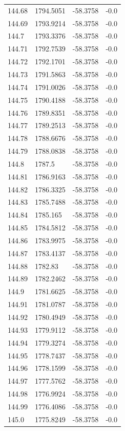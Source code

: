 \begin{table}[H]
\begin{tabular}{llll}
144.68 & 1794.5051 & -58.3758 & -0.0 \\
144.69 & 1793.9214 & -58.3758 & -0.0 \\
144.7 & 1793.3376 & -58.3758 & -0.0 \\
144.71 & 1792.7539 & -58.3758 & -0.0 \\
144.72 & 1792.1701 & -58.3758 & -0.0 \\
144.73 & 1791.5863 & -58.3758 & -0.0 \\
144.74 & 1791.0026 & -58.3758 & -0.0 \\
144.75 & 1790.4188 & -58.3758 & -0.0 \\
144.76 & 1789.8351 & -58.3758 & -0.0 \\
144.77 & 1789.2513 & -58.3758 & -0.0 \\
144.78 & 1788.6676 & -58.3758 & -0.0 \\
144.79 & 1788.0838 & -58.3758 & -0.0 \\
144.8 & 1787.5 & -58.3758 & -0.0 \\
144.81 & 1786.9163 & -58.3758 & -0.0 \\
144.82 & 1786.3325 & -58.3758 & -0.0 \\
144.83 & 1785.7488 & -58.3758 & -0.0 \\
144.84 & 1785.165 & -58.3758 & -0.0 \\
144.85 & 1784.5812 & -58.3758 & -0.0 \\
144.86 & 1783.9975 & -58.3758 & -0.0 \\
144.87 & 1783.4137 & -58.3758 & -0.0 \\
144.88 & 1782.83 & -58.3758 & -0.0 \\
144.89 & 1782.2462 & -58.3758 & -0.0 \\
144.9 & 1781.6625 & -58.3758 & -0.0 \\
144.91 & 1781.0787 & -58.3758 & -0.0 \\
144.92 & 1780.4949 & -58.3758 & -0.0 \\
144.93 & 1779.9112 & -58.3758 & -0.0 \\
144.94 & 1779.3274 & -58.3758 & -0.0 \\
144.95 & 1778.7437 & -58.3758 & -0.0 \\
144.96 & 1778.1599 & -58.3758 & -0.0 \\
144.97 & 1777.5762 & -58.3758 & -0.0 \\
144.98 & 1776.9924 & -58.3758 & -0.0 \\
144.99 & 1776.4086 & -58.3758 & -0.0 \\
145.0 & 1775.8249 & -58.3758 & -0.0 \\

\end{tabular}
\end{table}
